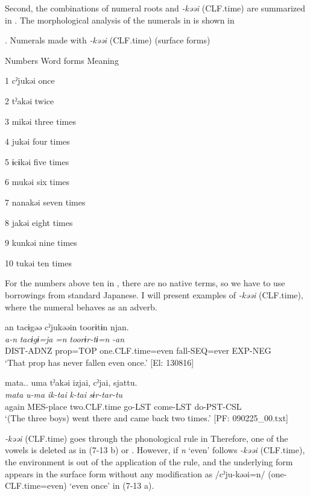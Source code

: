 Second, the combinations of numeral roots and \textit{{}-kəəi} (CLF.time) are summarized in . The morphological analysis of the numerals in  is shown in 

\begin{styleBeschriftung}
\textmd{}\textmd{. Numerals made with}\textmd{ \textit{-kəəi}}\textmd{ (CLF.time) (surface forms)}
\end{styleBeschriftung}

Numbers  Word forms  Meaning

1  cˀjukəi  once

2  tˀakəi  twice

3  mikəi  three times

4  jukəi  four times

5  ɨcɨkəi  five times

6  mukəi  six times

7  nanakəi  seven times

8  jakəi  eight times

9  kunkəi  nine times

10  tukəi  ten times

For the numbers above ten in , there are no native terms, so we have to use borrowings from standard Japanese. I will present examples of \textit{{}-kəəi} (CLF.time), where the numeral behaves as an adverb.

\ea \label{ex:7:13}
\ea \label{ex:7:13a}%
\glll  an  tacɨgəə  cˀjukəəin  toorɨtɨn  njan.\\
\textit{a-n}  \textit{tacɨgɨ=ja}  \textit{=n}  \textit{toorɨr-tɨ=n}  \textit{-an}\\
DIST-ADNZ  prop=TOP  one.CLF.time=even  fall-SEQ=ever  EXP-NEG\\
\glt ‘That prop has never fallen even once.’ [El: 130816]

\ex \label{ex:7:13b}%
\glll  mata..  uma  tˀakəi  izjai,  cˀjai,  sjattu.\\
\textit{mata}  \textit{u-ma}  \textit{}  \textit{ik-tai}  \textit{k-tai}  \textit{sɨr-tar-tu}\\
again  MES-place  two.CLF.time  go-LST  come-LST  do-PST-CSL\\
\glt ‘(The three boys) went there and came back two times.’ [PF: 090225\_00.txt]
\z
\z

\textit{{}-kəəi} (CLF.time) goes through the phonological rule in  Therefore, one of the vowels is deleted as in (7-13 b) or . However, if \textit{n} ‘even’ follows \textit{{}-kəəi} (CLF.time), the environment is out of the application of the rule, and the underlying form appears in the surface form without any modification as /cˀju-kəəi=n/ (one-CLF.time=even) ‘even once’ in (7-13 a).

